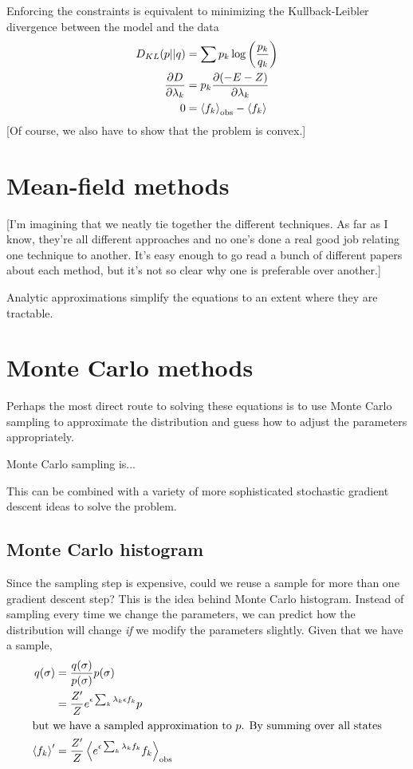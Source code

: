 \documentclass[11pt]{amsart}
\newcommand{\br}[1]{\left<#1\right>}
\begin{document}
Enforcing the constraints is equivalent to minimizing the Kullback-Leibler divergence between the model and the data
\begin{align}
	D_{KL}(p||q) &= \sum p_k \log\left(\frac{p_k}{q_k}\right)\\
	\frac{\partial D}{\partial \lambda_k} &= p_k \frac{\partial (-E-Z)}{\partial \lambda_k}\\
	0 &= \br{f_k}_{\rm obs} -\br{f_k}
\end{align}
[Of course, we also have to show that the problem is convex.]

\section{Mean-field methods}
[I'm imagining that we neatly tie together the different techniques. As far as I know, they're all different approaches and no one's done a real good job relating one technique to another. It's easy enough to go read a bunch of different papers about each method, but it's not so clear why one is preferable over another.]

Analytic approximations simplify the equations to an extent where they are tractable.

\section{Monte Carlo methods}
Perhaps the most direct route to solving these equations is to use Monte Carlo sampling to approximate the distribution and guess how to adjust the parameters appropriately.

Monte Carlo sampling is...

This can be combined with a variety of more sophisticated stochastic gradient descent ideas to solve the problem.

\subsection{Monte Carlo histogram}
Since the sampling step is expensive, could we reuse a sample for more than one gradient descent step? This is the idea behind Monte Carlo histogram. Instead of sampling every time we change the parameters, we can predict how the distribution will change \textit{if} we modify the parameters slightly. Given that we have a sample,
\begin{align}
	q(\sigma) &= \frac{q(\sigma)}{p(\sigma)}p(\sigma)\\
		&= \frac{Z'}{Z}e^{\epsilon\sum_k \lambda_k \epsilon f_k} p\\
\intertext{but we have a sampled approximation to $p$. By summing over all states}
	\br{f_k}' &= \frac{Z'}{Z} \br{e^{\epsilon\sum_k \lambda_k f_k} f_k}_{\rm obs}
\end{align}
\end{document}
